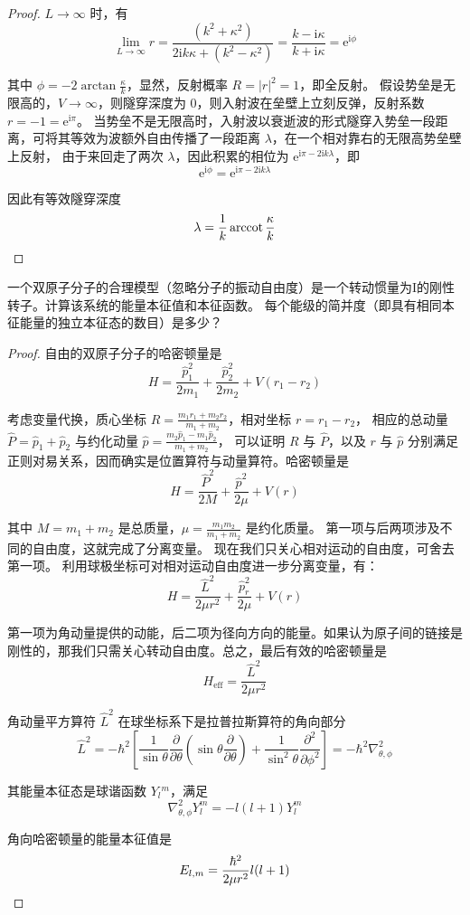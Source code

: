 \begin{proof}
    $L \rightarrow \infty$ 时，有
$$\lim_{L \rightarrow \infty} r=\frac{\left(k^{2}+\kappa^{2}\right)}{2 \mathrm{i} k \kappa+\left(k^{2}-\kappa^{2}\right)}
=\frac{k-\mathrm{i} \kappa}{k+\mathrm{i} \kappa}=\mathrm{e}^{\mathrm{i} \phi}$$

其中 $\phi=-2 \arctan \frac{\kappa}{k}$，显然，反射概率 $R=|r|^{2}=1$，即全反射。
假设势垒是无限高的，$V \rightarrow \infty$，则隧穿深度为 $0$，则入射波在垒壁上立刻反弹，反射系数 $r=-1=\mathrm{e}^{\mathrm{i} \pi}$。
当势垒不是无限高时，入射波以衰逝波的形式隧穿入势垒一段距离，可将其等效为波额外自由传播了一段距离 $\lambda$，在一个相对靠右的无限高势垒壁上反射，
由于来回走了两次 $\lambda$，因此积累的相位为 $\mathrm{e}^{\mathrm{i} \pi-2 \mathrm{i} k \lambda}$，即
$$\mathrm{e}^{\mathrm{i} \phi}
=\mathrm{e}^{\mathrm{i} \pi-2 \mathrm{i} k \lambda}$$

因此有等效隧穿深度
$$\lambda=\frac{1}{k} \operatorname{arccot} \frac{\kappa}{k}\qedhere$$

\end{proof}
\begin{4}
    一个双原子分子的合理模型（忽略分子的振动自由度）是一个转动惯量为I的刚性转子。计算该系统的能量本征值和本征函数。
    每个能级的简并度（即具有相同本征能量的独立本征态的数目）是多少？
\end{4}
\begin{proof}
自由的双原子分子的哈密顿量是
$$H=\frac{\hat{p}_{1}^{2}}{2m_{1}}+\frac{\hat{p}_{2}^{2}}{2m_{2}}+V(r_{1}-r_{2})$$

考虑变量代换，质心坐标 $R=\frac{m_{1} r_{1}+m_{2} r_{2}}{m_{1}+m_{2}}$，相对坐标 $r=r_{1}-r_{2}$，
相应的总动量 $\hat{P}=\hat{p}_{1}+\hat{p}_{2}$ 与约化动量 $\hat{p}=\frac{m_{2} \hat{p}_{1}-m_{1} \hat{p}_{2}}{m_{1}+m_{2}}$，
可以证明 $R$ 与 $\hat{P}$，以及 $r$ 与 $\hat{p}$ 分别满足正则对易关系，因而确实是位置算符与动量算符。哈密顿量是
$$H=\frac{\hat{P}^{2}}{2 M}+\frac{\hat{p}^{2}}{2 \mu}+V(r)$$

其中 $M=m_{1}+m_{2}$ 是总质量，$\mu=\frac{m_{1} m_{2}}{m_{1}+m_{2}}$ 是约化质量。
第一项与后两项涉及不同的自由度，这就完成了分离变量。
现在我们只关心相对运动的自由度，可舍去第一项。
利用球极坐标可对相对运动自由度进一步分离变量，有：
$$H=\frac{\hat{L}^{2}}{2 \mu r^{2}}+\frac{\hat{p}_{r}^{2}}{2 \mu}+V(r)$$

第一项为角动量提供的动能，后二项为径向方向的能量。如果认为原子间的链接是刚性的，那我们只需关心转动自由度。总之，最后有效的哈密顿量是
$$H_{\mathrm{eff}}=\frac{\hat{L}^{2}}{2 \mu r^{2}}$$

角动量平方算符 $\hat{L}^{2}$ 在球坐标系下是拉普拉斯算符的角向部分
$$\hat{L}^{2}=-\hbar^{2}\left[\frac{1}{\sin \theta} \frac{\partial}{\partial \theta}\left(\sin \theta \frac{\partial}{\partial \theta}\right)+\frac{1}{\sin^{2} \theta} \frac{\partial^{2}}{\partial \phi^{2}}\right]=-\hbar^{2} \nabla_{\theta, \phi}^{2}$$

其能量本征态是球谐函数 $Y_{l}{ }^{m}$，满足
$$\nabla_{\theta, \phi}^{2} Y_{l}^{m}=-l(l+1) Y_{l}^{m}$$

角向哈密顿量的能量本征值是
$$E_{l, m}=\frac{\hbar^{2}}{2 \mu r^{2}} l(l+1)\qedhere$$
\end{proof}
